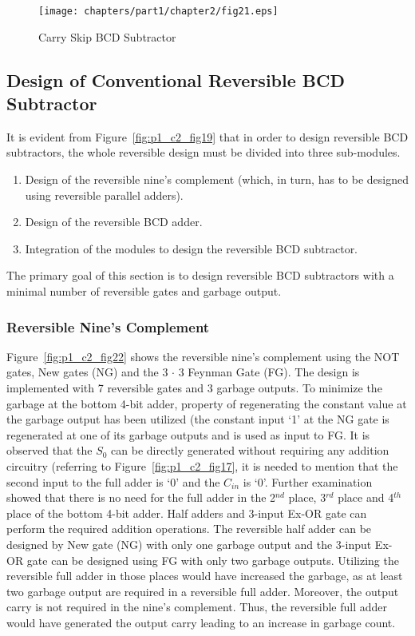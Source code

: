 \begin{figure}[!tbh]
	\centering
	\texttt{[image: chapters/part1/chapter2/fig21.eps]}
	\caption{Carry Skip BCD Subtractor}
	\label{fig:p1_c2_fig21}
\end{figure}


\subsection{Design of Conventional Reversible BCD Subtractor}
It is evident from Figure~\ref{fig:p1_c2_fig19} that in order to design reversible BCD subtractors, the whole reversible design must be divided into three sub-modules.
\begin{enumerate}
	\item  Design of the reversible nine's complement (which, in turn, has to be designed using reversible parallel adders).
	
	\item Design of the reversible BCD adder.
	
	\item Integration of the modules to design the reversible BCD subtractor.
\end{enumerate}

The primary goal of this section is to design reversible BCD subtractors with a minimal number of reversible gates and garbage output.

\subsubsection{Reversible Nine's Complement}

Figure~\ref{fig:p1_c2_fig22} shows the reversible nine's complement using the NOT gates, New gates (NG) and the 3 ${\cdot}$ 3 Feynman Gate (FG). The design is implemented with 7 reversible gates and 3 garbage outputs. To minimize the garbage at the bottom 4-bit adder, property of regenerating the constant value at the garbage output has been utilized (the constant input `1' at the NG gate is regenerated at one of its garbage outputs and is used as input to FG. It is observed that the $S_0$ can be directly generated without requiring any addition circuitry (referring to Figure~\ref{fig:p1_c2_fig17}, it is needed to mention that the second input to the full adder is `0' and the $C_{in}$ is `0'. Further examination showed that there is no need for the full adder in the 2${}^{nd}$ place, 3${}^{rd}$ place and 4${}^{th}$ place of the bottom 4-bit adder. Half adders and 3-input Ex-OR gate can perform the required addition operations. The reversible half adder can be designed by New gate (NG) with only one garbage output and the 3-input Ex-OR gate can be designed using FG with only two garbage outputs. Utilizing the reversible full adder in those places would have increased the garbage, as at least two garbage output are required in a reversible full adder. Moreover, the output carry is not required in the nine's complement. Thus, the reversible full adder would have generated the output carry leading to an increase in garbage count.

